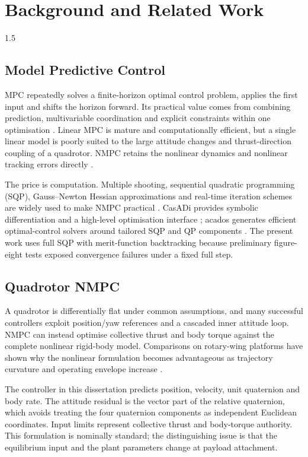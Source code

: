 \chapter{Background and Related Work}
\label{ch:literature}
\begin{spacing}{1.5}
\setlength{\parskip}{0.22in}

\section{Model Predictive Control}

MPC repeatedly solves a finite-horizon optimal control problem, applies the first input and shifts the horizon forward. Its practical value comes from combining prediction, multivariable coordination and explicit constraints within one optimisation \cite{rawlings2017mpc,mayne2014mpc}. Linear MPC is mature and computationally efficient, but a single linear model is poorly suited to the large attitude changes and thrust-direction coupling of a quadrotor. NMPC retains the nonlinear dynamics and nonlinear tracking errors directly \cite{grune2017nmpc}.

The price is computation. Multiple shooting, sequential quadratic programming (SQP), Gauss--Newton Hessian approximations and real-time iteration schemes are widely used to make NMPC practical \cite{diehl2005rti}. CasADi provides symbolic differentiation and a high-level optimisation interface \cite{andersson2019casadi}; acados generates efficient optimal-control solvers around tailored SQP and QP components \cite{verschueren2022acados}. The present work uses full SQP with merit-function backtracking because preliminary figure-eight tests exposed convergence failures under a fixed full step.

\section{Quadrotor NMPC}

A quadrotor is differentially flat under common assumptions, and many successful controllers exploit position/yaw references and a cascaded inner attitude loop. NMPC can instead optimise collective thrust and body torque against the complete nonlinear rigid-body model. Comparisons on rotary-wing platforms have shown why the nonlinear formulation becomes advantageous as trajectory curvature and operating envelope increase \cite{kamel2017linear}.

The controller in this dissertation predicts position, velocity, unit quaternion and body rate. The attitude residual is the vector part of the relative quaternion, which avoids treating the four quaternion components as independent Euclidean coordinates. Input limits represent collective thrust and body-torque authority. This formulation is nominally standard; the distinguishing issue is that the equilibrium input and the plant parameters change at payload attachment.


\end{spacing}
